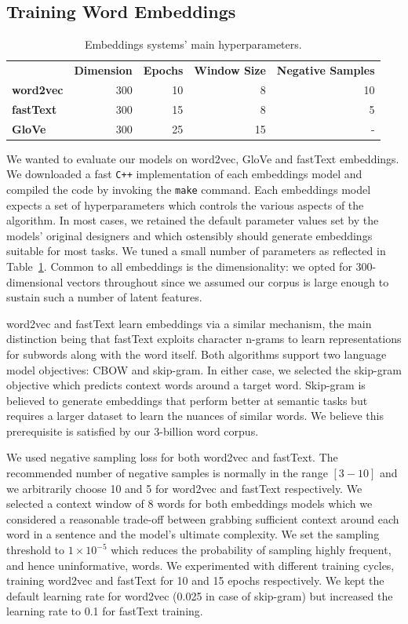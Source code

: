 \subsection{Training Word Embeddings}
\begin{table}\centering
    \begin{tabular}{@{}lrrrr@{}} \toprule
    & \textbf{Dimension} & \textbf{Epochs} & \textbf{Window Size} & \textbf{Negative Samples} \\ \cmidrule{2-5}
    \textbf{word2vec} & 300 & 10 & 8 & 10 \\  
    \textbf{fastText} & 300 & 15 & 8 & 5 \\
    \textbf{GloVe} & 300 & 25 & 15 & - \\
    \bottomrule
    \end{tabular}
    \caption{Embeddings systems' main hyperparameters.}\label{tab:semeval_embeddings_hyper}
\end{table}
We wanted to evaluate our models on word2vec, GloVe and fastText embeddings.  We downloaded a fast \texttt{C++} implementation of each embeddings model and compiled the code by invoking the \texttt{make} command.  Each embeddings model expects a set of hyperparameters which controls the various aspects of the algorithm.  In most cases, we retained the default parameter values set by the models' original designers and which ostensibly should generate embeddings suitable for most tasks.  We tuned a small number of parameters as reflected in Table~\ref{tab:semeval_embeddings_hyper}.  Common to all embeddings is the dimensionality: we opted for 300-dimensional vectors throughout since we assumed our corpus is large enough to sustain such a number of latent features.

word2vec and fastText learn embeddings via a similar mechanism, the main distinction being that fastText exploits character n-grams to learn representations for subwords along with the word itself.  Both algorithms support two language model objectives: \ac{CBOW} and skip-gram.  In either case, we selected the skip-gram objective which predicts context words around a target word.  Skip-gram is believed to generate embeddings that perform better at semantic tasks \citep{mikolov2013distributed} but requires a larger dataset to learn the nuances of similar words.  We believe this prerequisite is satisfied by our 3-billion word corpus.  

We used negative sampling loss for both word2vec and fastText.  The recommended number of negative samples is normally in the range $[3-10]$ and we arbitrarily choose 10 and 5 for word2vec and fastText respectively.  We selected a context window of 8 words for both embeddings models which we considered a  reasonable trade-off between grabbing sufficient context around each word in a sentence and the model's ultimate complexity.  We set the sampling threshold to $1\times10^{-5}$ which reduces the probability of sampling highly frequent, and hence uninformative, words.  We experimented with different training cycles, training word2vec and fastText for 10 and 15 epochs respectively.  We kept the default learning rate for word2vec (0.025 in case of skip-gram) but increased the learning rate to 0.1 for fastText training.  

